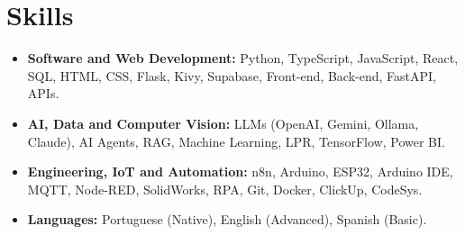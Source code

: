 \documentclass[a4paper,10pt]{article}
\begin{document}

\section{Skills}

    \begin{itemize}
        \item \textbf{Software and Web Development:} Python, TypeScript, JavaScript, React, SQL, HTML, CSS, Flask, Kivy, Supabase, Front-end, Back-end, FastAPI, APIs.
        \item \textbf{AI, Data and Computer Vision:} LLMs (OpenAI, Gemini, Ollama, Claude), AI Agents, RAG, Machine Learning, LPR, TensorFlow, Power BI.
        \item \textbf{Engineering, IoT and Automation:} n8n, Arduino, ESP32, Arduino IDE, MQTT, Node-RED, SolidWorks, RPA, Git, Docker, ClickUp, CodeSys.
        \item \textbf{Languages:} Portuguese (Native), English (Advanced), Spanish (Basic).
    \end{itemize}
\end{document}
